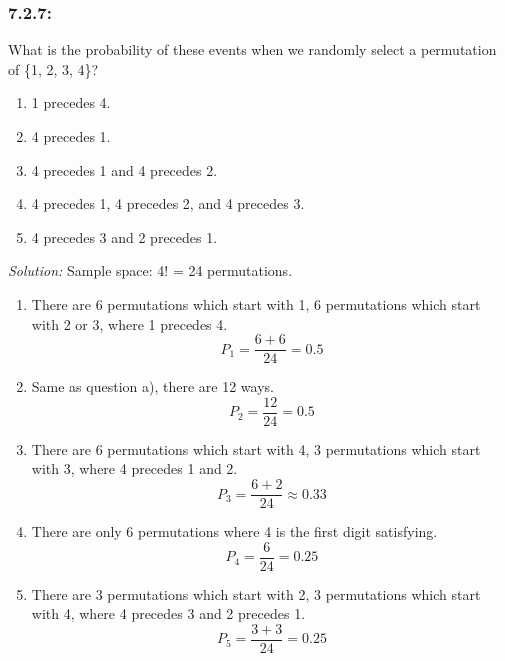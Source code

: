 \documentclass[a4paper]{article}
\begin{document}
	\subsubsection*{7.2.7:}
    What is the probability of these events when we randomly select a permutation of \{1, 2, 3, 4\}?
    \begin{enumerate}[label = \textbf{\alph*)}]
    \item 1 precedes 4.
    \item 4 precedes 1.
    \item 4 precedes 1 and 4 precedes 2.
    \item 4 precedes 1, 4 precedes 2, and 4 precedes 3.
    \item 4 precedes 3 and 2 precedes 1.
    \end{enumerate}
    \emph{Solution:}
    Sample space: 4! = 24 permutations.
    \begin{enumerate}[label = \textbf{\alph*)}]
        \item There are 6 permutations which start with 1, 6 permutations which start with 2 or 3, where 1 precedes 4.
        \begin{equation*}
            P_1 =  \frac{6+6}{24} = 0.5
        \end{equation*}
        \item Same as question a), there are 12 ways.
        \begin{equation*}
            P_2 = \frac{12}{24} = 0.5
        \end{equation*} 
        \item There are 6 permutations which start with 4, 3 permutations which start with 3, where 4 precedes 1 and 2.
        \begin{equation*}
            P_3 = \frac{6+2}{24} \approx 0.33
        \end{equation*} 
        \item There are only 6 permutations where 4 is the first digit satisfying.
        \begin{equation*}
            P_4 = \frac{6}{24} = 0.25
        \end{equation*} 
        \item There are 3 permutations which start with 2, 3 permutations which start with 4, where 4 precedes 3 and 2 precedes 1.
        \begin{equation*}
            P_5 =  \frac{3+3}{24} = 0.25
        \end{equation*}
    \end{enumerate}
\end{document}
